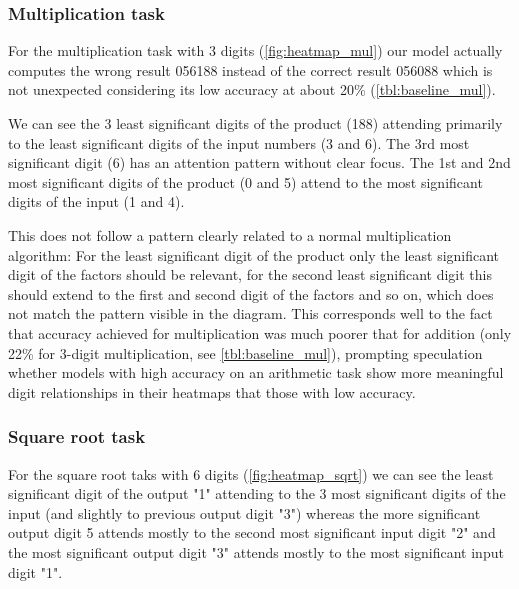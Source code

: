 \subsubsection{Multiplication task}


For the multiplication task with 3 digits (\cref{fig:heatmap_mul}) our model actually computes the wrong result 056188 instead of the correct result 056088 which is not unexpected considering its low accuracy at about 20\% (\cref{tbl:baseline_mul}).

We can see the 3 least significant digits of the product (188) attending primarily to the  least significant digits of the input numbers (3 and 6). The 3rd most significant digit (6) has an attention pattern without clear focus. The 1st and 2nd most significant digits of the product (0 and 5) attend to the most significant digits of the input (1 and 4).

This does not follow a pattern clearly related to a normal multiplication algorithm: For the least significant digit of the product only the least significant digit of the factors should be relevant, for the second least significant digit this should extend to the first and second digit of the factors and so on, which does not match the pattern visible in the diagram.
This corresponds well to the fact that accuracy achieved for multiplication was much poorer that for addition (only 22\% for 3-digit multiplication, see \cref{tbl:baseline_mul}), prompting speculation whether models with high accuracy on an arithmetic task show more meaningful digit relationships in their heatmaps that those with low accuracy.

\subsubsection{Square root task}


For the square root taks with 6 digits (\cref{fig:heatmap_sqrt}) we can see the least significant digit of the output "1" attending to the 3 most significant digits of the input (and slightly to previous output digit "3") whereas the more significant output digit 5 attends mostly to the second most significant input digit "2" and the most significant output digit "3" attends mostly to the most significant input digit "1".

